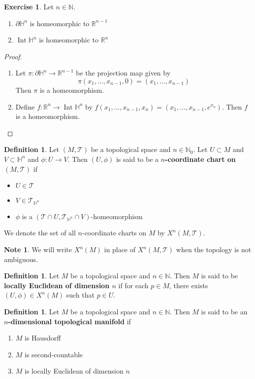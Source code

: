 \documentclass{book}
\theoremstyle{definition}
\newtheorem{defn}[definition]{Definition}
\newtheorem{note}[definition]{Note}
\newtheorem{ex}[definition]{Exercise}
\renewcommand{\H}{\mathbb{H}}
\newcommand{\N}{\mathbb{N}}
\newcommand{\R}{\mathbb{R}}
\newcommand{\MT}{\mathcal{T}}
\DeclareMathOperator{\Int}{Int}
\DeclareMathOperator*{\0}{\mbf{0}}
\DeclareMathOperator*{\1}{\mbf{1}}
\newcommand{\tbf}[1]{\textbf{#1}}
\newcommand{\p}{\partial}
\begin{document}
	\begin{ex} Let $n \in \N$.
	\begin{enumerate}
		\item $\p \H^n$ is homeomorphic to $\R^{n-1}$
		\item $\Int \H^n$ is homeomorphic to $\R^n$
	\end{enumerate}  
	\end{ex}
	
	\begin{proof}\
	\begin{enumerate}
		\item Let $\pi: \p \H^n \rightarrow \R^{n-1}$ be the projection map given by 
		$$\pi(x_1, \ldots, x_{n-1}, 0) = (x_1, \ldots, x_{n-1})$$ 
		Then $\pi$ is a homeomorphism.
		\item Define $f: \R^n \rightarrow \Int \H^n$ by $f(x_1, \ldots, x_{n-1}, x_n) = (x_1, \ldots, x_{n-1}, e^{x_n})$. Then $f$ is a homeomorphism.
	\end{enumerate}
	\end{proof}		
	
	\begin{defn}
		Let $(M, \MT)$ be a topological space and $n \in \N_0$. Let $U \subset M$ and $V \subset \H^n$ and $\phi:U \rightarrow V$. Then $(U, \phi)$ is said to be a \tbf{$n$-coordinate chart on $(M, \MT)$} if 
		\begin{itemize}
			\item $U \in \MT$ 
			\item $V \in \MT_{\H^n}$
			\item $\phi$ is a $(\MT \cap U, \MT_{\H^n} \cap V)$-homeomorphism 
		\end{itemize}
	We denote the set of all $n$-coordinate charts on $M$ by $X^n(M, \MT)$.
	\end{defn}

	\begin{note}
		We will write $X^n(M)$ in place of $X^n(M, \MT)$ when the topology is not ambiguous.
	\end{note} 

	\begin{defn}
		Let $M$ be a topological space and $n \in \N$. Then $M$ is said to be \tbf{locally Euclidean of dimension $n$} if for each $p \in M$, there exists $(U, \phi) \in X^n(M)$ such that $p \in U$. 
	\end{defn}

	\begin{defn}
		Let $M$ be a topological space and $n \in \N$. Then $M$ is said to be an \tbf{$n$-dimensional topological manifold} if 
		\begin{enumerate}
			\item $M$ is Hausdorff
			\item $M$ is second-countable
			\item $M$ is locally Euclidean of dimension $n$
		\end{enumerate}
	\end{defn}
\end{document}
